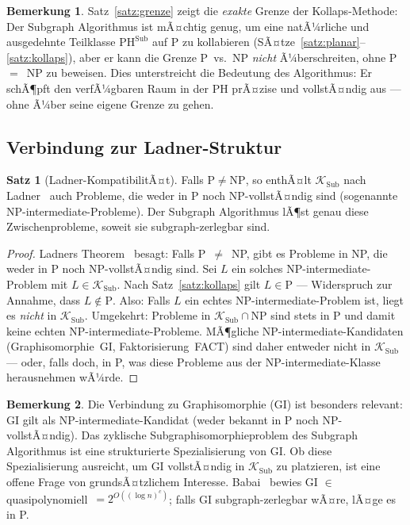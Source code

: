 ﻿\documentclass[a4paper,12pt]{article}
\theoremstyle{definition}
\newtheorem{satz}{Satz}
\newtheorem{bemerkung}{Bemerkung}
\begin{document}
\begin{bemerkung}
  Satz~\ref{satz:grenze} zeigt die \emph{exakte} Grenze der Kollaps-Methode:
  Der Subgraph Algorithmus ist mÃ¤chtig genug, um eine natÃ¼rliche und ausgedehnte
  Teilklasse $\mathrm{PH}^{\mathrm{Sub}}$ auf P zu kollabieren
  (SÃ¤tze~\ref{satz:planar}--\ref{satz:kollaps}),
  aber er kann die Grenze P~vs.~NP \emph{nicht} Ã¼berschreiten, ohne P~$=$~NP zu beweisen.
  Dies unterstreicht die Bedeutung des Algorithmus: Er schÃ¶pft den verfÃ¼gbaren
  Raum in der PH prÃ¤zise und vollstÃ¤ndig aus --- ohne Ã¼ber seine eigene Grenze zu gehen.
\end{bemerkung}

\subsection{Verbindung zur Ladner-Struktur}

\begin{satz}[Ladner-KompatibilitÃ¤t]
\label{satz:ladner}
  Falls $\mathrm{P} \neq \mathrm{NP}$, so enthÃ¤lt $\mathcal{K}_\mathrm{Sub}$ nach
  Ladner~\cite{ladner1975structure} auch Probleme, die weder in P noch NP-vollstÃ¤ndig sind
  (sogenannte NP-intermediate-Probleme).
  Der Subgraph Algorithmus lÃ¶st genau diese Zwischenprobleme,
  soweit sie subgraph-zerlegbar sind.
\end{satz}

\begin{proof}
  Ladners Theorem~\cite{ladner1975structure} besagt: Falls P~$\neq$~NP, gibt es
  Probleme in NP, die weder in P noch NP-vollstÃ¤ndig sind.
  Sei $L$ ein solches NP-intermediate-Problem mit $L \in \mathcal{K}_\mathrm{Sub}$.
  Nach Satz~\ref{satz:kollaps} gilt $L \in \mathrm{P}$ --- Widerspruch zur Annahme,
  dass $L \notin \mathrm{P}$.
  Also: Falls $L$ ein echtes NP-intermediate-Problem ist, liegt es \emph{nicht}
  in $\mathcal{K}_\mathrm{Sub}$.
  Umgekehrt: Probleme in $\mathcal{K}_\mathrm{Sub} \cap \mathrm{NP}$ sind stets in P
  und damit keine echten NP-intermediate-Probleme.
  MÃ¶gliche NP-intermediate-Kandidaten (Graphisomorphie~GI, Faktorisierung~FACT)
  sind daher entweder nicht in $\mathcal{K}_\mathrm{Sub}$ --- oder, falls doch,
  in P, was diese Probleme aus der NP-intermediate-Klasse herausnehmen wÃ¼rde.
\end{proof}

\begin{bemerkung}
  Die Verbindung zu Graphisomorphie (GI) ist besonders relevant:
  GI gilt als NP-intermediate-Kandidat (weder bekannt in P noch NP-vollstÃ¤ndig).
  Das zyklische Subgraphisomorphieproblem des Subgraph Algorithmus ist
  eine strukturierte Spezialisierung von GI.
  Ob diese Spezialisierung ausreicht, um GI vollstÃ¤ndig in $\mathcal{K}_\mathrm{Sub}$
  zu platzieren, ist eine offene Frage von grundsÃ¤tzlichem Interesse.
  Babai~\cite{babai2016graph} bewies GI $\in$ quasipolynomiell~$= 2^{O((\log n)^c)}$;
  falls GI subgraph-zerlegbar wÃ¤re, lÃ¤ge es in P.
\end{bemerkung}
\end{document}
